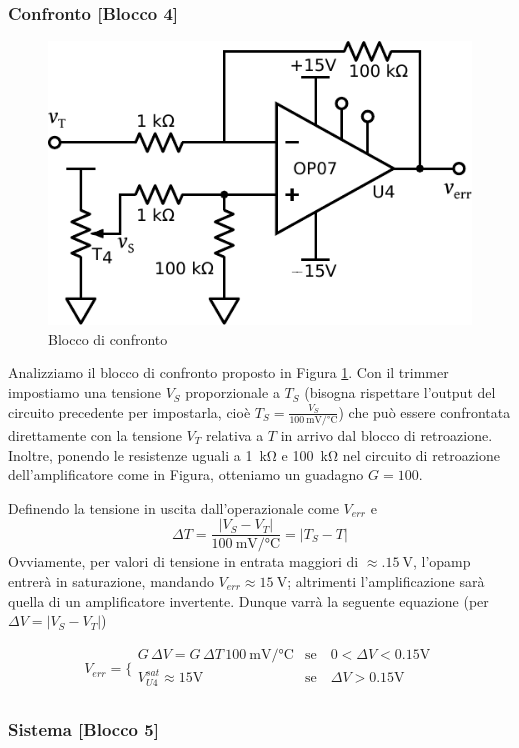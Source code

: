 \subsubsection{Confronto [Blocco 4]}

\begin{figure}
\centering
\includegraphics[width=.33\textwidth]{../E06/latex/P4.pdf}
\caption{Blocco di confronto}
\label{fig6:blocco4}
\end{figure}

Analizziamo il blocco di confronto proposto in Figura \ref{fig6:blocco4}.
Con il trimmer impostiamo una tensione $V_{S}$ proporzionale a $T_{S}$ (bisogna rispettare l'output del circuito precedente per impostarla, cioè $T_S = \frac{V_S}{\SI{100}{\milli\volt\per\celsius}}$) che può essere confrontata direttamente con la tensione $V_{T}$ relativa a $T$ in arrivo dal blocco di retroazione.
Inoltre, ponendo le resistenze uguali a \SI{1}{\kilo\ohm} e \SI{100}{\kilo\ohm} nel circuito di retroazione dell'amplificatore come in Figura, otteniamo un guadagno $G=100$.

Definendo la tensione in uscita dall'operazionale come $V_{err}$ e
$$\Delta T = \frac{|V_{S}-V_{T}|}{\SI{100}{\milli\volt}/\si{\celsius}}= | T_S - T | $$
Ovviamente, per valori di tensione in entrata maggiori di $\approx \SI{.15}{\volt}$, l'opamp entrerà in saturazione, mandando $V_{err}\approx \SI{15}{\volt}$; altrimenti l'amplificazione sarà quella di un amplificatore invertente.
Dunque varrà la seguente equazione (per $\Delta V = |V_S - V_T|$)

\begin{equation}
V_{err} = \bigg \{
\begin{array}{rl}
G \,\Delta V = G \,\Delta T \,\SI{100}{\milli\volt}/\si{\celsius}  & \mathrm{se} \quad 0<\Delta V<0.15 \si{\volt} \\
V_{U4}^{sat}\approx 15 \si{\volt} & \mathrm{se} \quad \Delta V>0.15 \si{\volt} \\
\end{array}
\label{eq6:exit_opamp}
\end{equation}

\subsubsection{Sistema [Blocco 5]}

